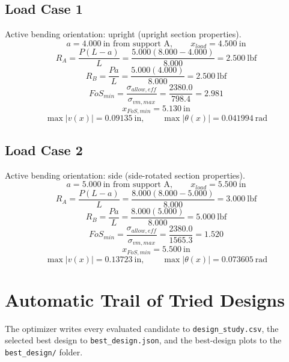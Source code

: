 \documentclass[11pt]{article}
\begin{document}
\subsection*{Load Case 1}
Active bending orientation: upright (upright section properties).
\[a = 4.000\ \mathrm{in} \text{ from support A}, \qquad x_{load} = 4.500\ \mathrm{in}\]
\[R_A = \frac{P(L-a)}{L} = \frac{5.000(8.000-4.000)}{8.000} = 2.500\ \mathrm{lbf}\]
\[R_B = \frac{Pa}{L} = \frac{5.000(4.000)}{8.000} = 2.500\ \mathrm{lbf}\]
\[FoS_{min} = \frac{\sigma_{allow,eff}}{\sigma_{vm,max}} = \frac{2380.0}{798.4} = 2.981\]
\[x_{FoS,min} = 5.130\ \mathrm{in}\]
\[\max |v(x)| = 0.09135\ \mathrm{in}, \qquad \max |\theta(x)| = 0.041994\ \mathrm{rad}\]
\subsection*{Load Case 2}
Active bending orientation: side (side-rotated section properties).
\[a = 5.000\ \mathrm{in} \text{ from support A}, \qquad x_{load} = 5.500\ \mathrm{in}\]
\[R_A = \frac{P(L-a)}{L} = \frac{8.000(8.000-5.000)}{8.000} = 3.000\ \mathrm{lbf}\]
\[R_B = \frac{Pa}{L} = \frac{8.000(5.000)}{8.000} = 5.000\ \mathrm{lbf}\]
\[FoS_{min} = \frac{\sigma_{allow,eff}}{\sigma_{vm,max}} = \frac{2380.0}{1565.3} = 1.520\]
\[x_{FoS,min} = 5.500\ \mathrm{in}\]
\[\max |v(x)| = 0.13723\ \mathrm{in}, \qquad \max |\theta(x)| = 0.073605\ \mathrm{rad}\]

\section*{Automatic Trail of Tried Designs}
The optimizer writes every evaluated candidate to \texttt{design\_study.csv}, the selected best design to \texttt{best\_design.json}, and the best-design plots to the \texttt{best\_design/} folder.
\end{document}
